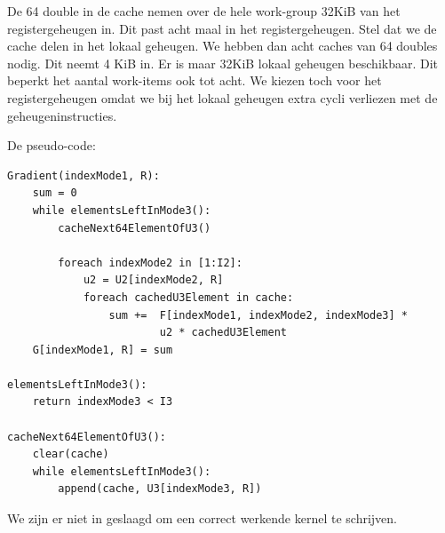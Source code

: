 De 64 double in de cache nemen over de hele work-group 32KiB van het registergeheugen in. Dit past acht maal in het registergeheugen. Stel dat we de cache delen in het lokaal geheugen. We hebben dan acht caches van 64 doubles nodig. Dit neemt 4 KiB in. Er is maar 32KiB lokaal geheugen beschikbaar. Dit beperkt het aantal work-items ook tot acht. We kiezen toch voor het registergeheugen omdat we bij het lokaal geheugen extra cycli verliezen met de geheugeninstructies.

De pseudo-code:

\begin{lstlisting}
Gradient(indexMode1, R):
	sum = 0
	while elementsLeftInMode3():
		cacheNext64ElementOfU3()
		
		foreach indexMode2 in [1:I2]:
			u2 = U2[indexMode2, R]
			foreach cachedU3Element in cache:
				sum += 	F[indexMode1, indexMode2, indexMode3] *
						u2 * cachedU3Element
	G[indexMode1, R] = sum

elementsLeftInMode3():
	return indexMode3 < I3

cacheNext64ElementOfU3():
	clear(cache)
	while elementsLeftInMode3():
		append(cache, U3[indexMode3, R])
\end{lstlisting}

We zijn er niet in geslaagd om een correct werkende kernel te schrijven.
